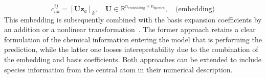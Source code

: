 \begin{equation}
  \label{eq:chemical_embedding}
  c^{ij}_{ak} = [\mathbf{U}\mathbf{z}_a]_k, \quad \mathbf{U}\in\mathbb{R}^{n_\text{embedding}\times n_\text{species}}, \quad \text{(embedding)}
\end{equation}
This embedding is subsequently combined with the basis expansion coefficients %
by an addition or a nonlinear transformation~\cite{schutt2018schnet}.
The former approach retains a clear formulation of the chemical information entering the model that is performing the prediction, while the latter one looses interepretability due to the combination of the embedding and basis coefficients.
Both approaches can be extended to include species information from the central atom in their numerical description.






